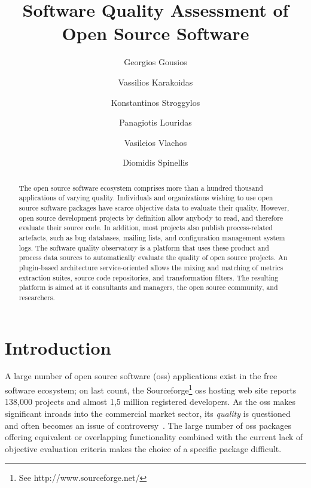 \documentclass{llncs}
\begin{document}
\title{Software Quality Assessment of Open Source Software}

\author{Georgios Gousios \and Vassilios Karakoidas \and Konstantinos Stroggylos 
\and Panagiotis Louridas \and Vasileios Vlachos \and Diomidis Spinellis}


\maketitle 


\begin{abstract}
The open source software ecosystem comprises more than a hundred thousand
applications of varying quality.
Individuals and organizations wishing to use open source software packages
have scarce objective data to evaluate their quality.
However,
open source development projects by definition allow anybody
to read, and therefore evaluate their source code.
In addition, most projects also publish process-related artefacts,
such as bug databases, mailing lists, and configuration management system logs.
The software quality observatory is a platform that uses these product
and process data sources
to automatically evaluate the quality of open source projects.
An plugin-based architecture service-oriented allows the mixing and matching of
metrics extraction suites, source code repositories, and transformation
filters.
The resulting platform is aimed at {\sc it} consultants and managers, the
open source community, and researchers.
\end{abstract}

\section{Introduction} %

A large number of open source software ({\sc oss})
applications exist in the free software 
ecosystem; on last count, the Sourceforge\footnote{See http://www.sourceforge.net/} {\sc oss} hosting web site reports 
138,000 projects and almost 1,5 million registered developers.
As the {\sc oss} makes significant inroads into the commercial
market sector, its \emph{quality} is questioned and often becomes an issue
of controversy~\cite{MICR06,ASS06}. The large number of {\sc oss} packages
offering equivalent or overlapping functionality combined with the current
lack of objective evaluation criteria makes the choice of a specific package
difficult.
\end{document}
